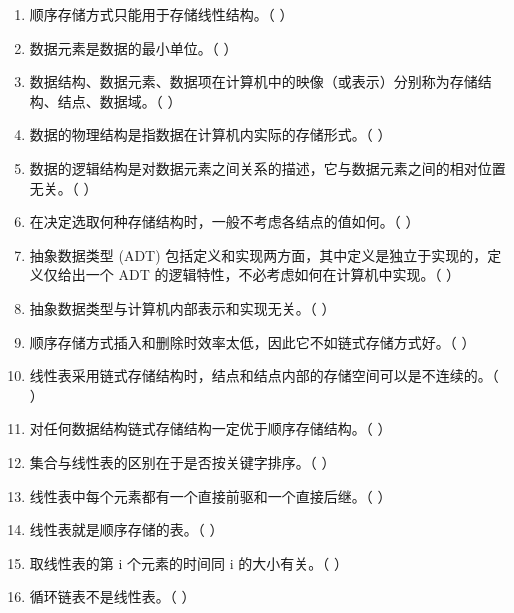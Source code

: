 \documentclass[12pt, a4paper]{article}
\begin{document}
\begin{enumerate}
	\item 顺序存储方式只能用于存储线性结构。（ ）
	\item 数据元素是数据的最小单位。（ ）
	\item 数据结构、数据元素、数据项在计算机中的映像（或表示）分别称为存储结构、结点、数据域。（ ）
	\item 数据的物理结构是指数据在计算机内实际的存储形式。（ ）
	\item 数据的逻辑结构是对数据元素之间关系的描述，它与数据元素之间的相对位置无关。（ ）
	\item 在决定选取何种存储结构时，一般不考虑各结点的值如何。（ ）
	\item 抽象数据类型 (ADT) 包括定义和实现两方面，其中定义是独立于实现的，定义仅给出一个 ADT 的逻辑特性，不必考虑如何在计算机中实现。（ ）
	\item 抽象数据类型与计算机内部表示和实现无关。（ ）
	\item 顺序存储方式插入和删除时效率太低，因此它不如链式存储方式好。（ ）
	\item 线性表采用链式存储结构时，结点和结点内部的存储空间可以是不连续的。（ ）
	\item 对任何数据结构链式存储结构一定优于顺序存储结构。（ ）
	\item 集合与线性表的区别在于是否按关键字排序。（ ）
	\item 线性表中每个元素都有一个直接前驱和一个直接后继。（ ）
	\item 线性表就是顺序存储的表。（ ）
	\item 取线性表的第 i 个元素的时间同 i 的大小有关。（ ）
	\item 循环链表不是线性表。（ ）
\end{enumerate}
\end{document}
